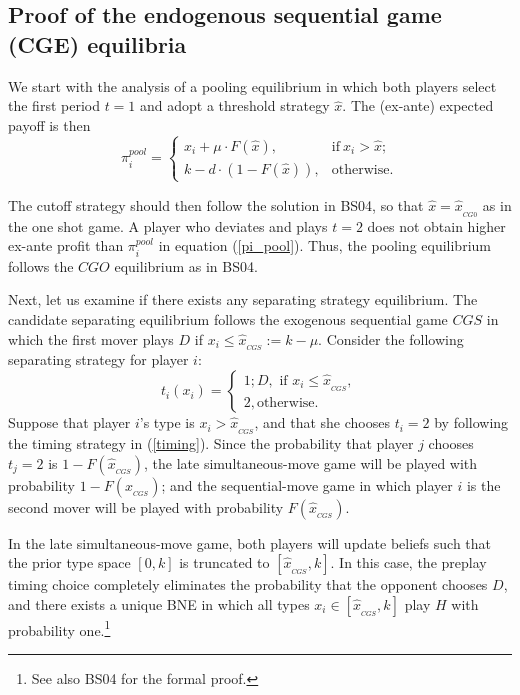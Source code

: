 \documentclass[11pt, letterpaper]{article}
\theoremstyle{plain}
\begin{document}
\subsection*{Proof of the endogenous sequential game (CGE) equilibria}

We start with the analysis of a pooling equilibrium in which both players select the first period $t=1$ and adopt a threshold strategy $\hat{x}$. The (ex-ante) expected payoff is then
\begin{equation}
   \pi^{pool}_{i} = 
   \begin{cases}
    x_i + \mu \cdot F(\hat{x}), &  \text{if} \  x_{i}> \hat{x};\\
    k - d \cdot (1-F(\hat{x})), & \text{otherwise}. 
   \end{cases}
   \label{pi_pool}
\end{equation}

The cutoff strategy should then follow the solution in BS04, so that $\hat{x}=\hat{x}_{_{CG0}}$ as in the one shot game. A player who deviates and plays $t=2$ does not obtain higher ex-ante profit than $\pi^{pool}_{i}$  in equation (\ref{pi_pool}). Thus, the pooling equilibrium follows the $CGO$ equilibrium as in BS04. 

Next, let us examine if there exists any separating strategy equilibrium. The candidate separating equilibrium follows the exogenous sequential game $CGS$ in which the first mover plays $D$ if $x_i\leq \hat{x}_{_{CGS}}:= k-\mu$. Consider the following separating strategy for player $i $:
\begin{equation}
 t_i(x_i)=
 \begin{cases} 1; D, \mbox{ if } x_i  \leq \hat{x}_{_{CGS}}, \\
 2,  \text{otherwise}.
 \end{cases}
 \label{timing}
\end{equation}
Suppose that player $i$'s type is $x_i >\hat{x}_{_{CGS}}$, and that she chooses $t_i=2$ by following the timing strategy  in (\ref{timing}).  Since the probability that player $j$ chooses $t_j=2$ is $1-F(\hat{x}_{_{CGS}})$, the late simultaneous-move game will be played with probability $1-F(\hat{x}_{_{CGS}})$; and the sequential-move game in which player $i$ is the second mover will be played with probability $F(\hat{x}_{_{CGS}})$.

In the late simultaneous-move game, both players will update beliefs such that the prior type space $[0, k]$ is truncated to $[\hat{x}_{_{CGS}},k]$. In this case, the preplay timing choice completely eliminates the probability that the opponent chooses $D$, and there exists a unique BNE in which all types $x_i \in [\hat{x}_{_{CGS}},k]$ play $H$ with probability one.\footnote{See also BS04 for the formal proof.} 
 
\end{document}
